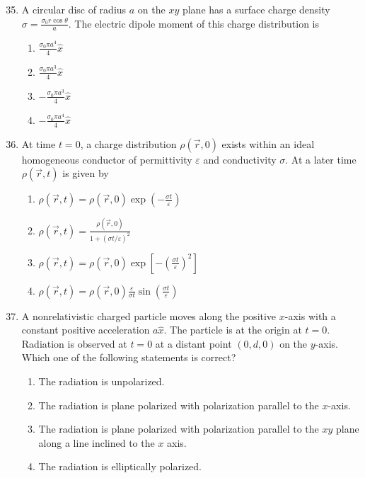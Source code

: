 \documentclass[journal]{IEEEtran}
\begin{document}
\begin{enumerate}
		\setcounter{enumi}{34}
    

 
    \item A circular disc of radius $a$ on the $x y$ plane has a surface charge density $\sigma=\frac{\sigma_{0} r \cos \theta}{a}$. The electric dipole moment of this charge distribution is
    \begin{multicols}{4}
			\begin{enumerate}
\item $\frac{\sigma_{0} \pi a^{4}}{4} \hat{x}$
\item $\frac{\sigma_{0} \pi a^{3}}{4} \hat{x}$
\item $-\frac{\sigma_{0} \pi a^{3}}{4} \hat{x}$
\item $-\frac{\sigma_{0} \pi a^{4}}{4} \hat{x}$
        \end{enumerate}
		\end{multicols}

    \item At time $t=0$, a charge distribution $\rho(\vec{r}, 0)$ exists within an ideal homogeneous conductor of permittivity $\varepsilon$ and conductivity $\sigma$. At a later time $\rho(\vec{r}, t)$ is given by


		\begin{multicols}{1}
			\begin{enumerate}
	\item  $\rho(\vec{r}, t)=\rho(\vec{r}, 0) \exp \left(-\frac{\sigma t}{\varepsilon}\right)$
\item $\rho(\vec{r}, t)=\frac{\rho(\vec{r}, 0)}{1+(\sigma t / \varepsilon)^{2}}$
\item $\rho(\vec{r}, t)=\rho(\vec{r}, 0) \exp \left[-\left(\frac{\sigma t}{\varepsilon}\right)^{2}\right]$
\item $\rho(\vec{r}, t)=\rho(\vec{r}, 0) \frac{\varepsilon}{\sigma t} \sin \left(\frac{\sigma t}{\varepsilon}\right)$
			\end{enumerate}
		\end{multicols}

    \item  A nonrelativistic charged particle moves along the positive $x$-axis with a constant positive acceleration $a \hat{x}$. The particle is at the origin at $t=0$. Radiation is observed at $t=0$ at a distant point $(0, d, 0)$ on the $y$-axis. Which one of the following statements is correct?
        
            \begin{enumerate}
             \item The radiation is unpolarized.
\item The radiation is plane polarized with polarization parallel to the $x$-axis.
\item The radiation is plane polarized with polarization parallel to the $x y$ plane along a line inclined to the $x$ axis.
\item The radiation is elliptically polarized.
            \end{enumerate}




\end{enumerate}
\end{document}
